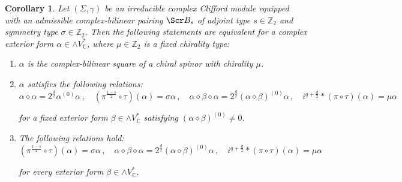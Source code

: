 \documentclass[10pt,a4paper,twoside,reqno]{amsart}
\theoremstyle{plain}
\newtheorem{cor}[thm]{Corollary}
\theoremstyle{definition}
\theoremstyle{remark}
\def\C{\mathbb{C}}
\def\scB{\Scr B}
\begin{document}
\begin{cor}
\label{cor:sq_B_chiral}
Let $(\Sigma,\gamma)$ be an irreducible complex Clifford module equipped with an admissible complex-bilinear pairing $\scB_s$ of adjoint type $s\in\mathbb{Z}_2$ and symmetry type $\sigma\in\mathbb{Z}_2$. Then the following statements are equivalent for a complex exterior form $\alpha\in\wedge V^*_\C$, where $\mu\in\mathbb{Z}_2$ is a fixed chirality type: 
\begin{enumerate}
\item[\normalfont(a)] $\alpha$ is the complex-bilinear square of a chiral spinor with chirality $\mu$.
\item[\normalfont(b)] $\alpha$ satisfies the following relations: 
\begin{equation*}
\alpha\diamond\alpha=2^{\frac{d}{2}} \alpha^{(0)}\alpha\, , \quad (\pi^{\frac{1-s}{2}}\circ\tau)(\alpha) = \sigma \alpha\, , \quad \alpha \diamond \beta\diamond\alpha=2^{\frac{d}{2}}(\alpha\diamond\beta)^{(0)}\alpha\, ,\quad i^{q+\frac{d}{2}}\ast (\pi\circ\tau)(\alpha)=\mu\alpha
\end{equation*}

\noindent
for a fixed exterior form $\beta\in\wedge V^*_\C$ satisfying $(\alpha\diamond\beta)^{(0)} \neq 0$.
\item[\normalfont(c)] The following relations hold: 
\begin{equation*}
(\pi^{\frac{1-s}{2}}\circ\tau)(\alpha) = \sigma \alpha\, , \quad \alpha \diamond \beta\diamond\alpha=2^{\frac{d}{2}}(\alpha\diamond\beta)^{(0)}\alpha\, ,\quad i^{q+\frac{d}{2}}\ast (\pi\circ\tau)(\alpha)=\mu\alpha
\end{equation*}

\noindent
for every exterior form $\beta\in\wedge V^*_\C$.
\end{enumerate}
\end{cor}
\end{document}
